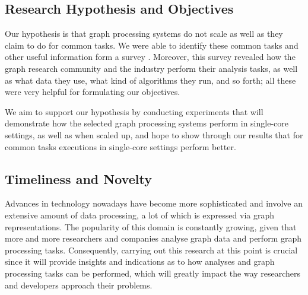\documentclass[a4paper,11pt]{article}
\begin{document}
\subsection{Research Hypothesis and Objectives}

\par Our hypothesis is that graph processing systems do not scale as well as they claim to do for common tasks. We were able to identify these common tasks and other useful information form a survey \cite{survey}. Moreover, this survey revealed how the graph research community and the industry perform their analysis tasks, as well as what data they use, what kind of algorithms they run, and so forth; all these were very helpful for formulating our objectives.

\medskip

\par We aim to support our hypothesis by conducting experiments that will demonstrate how the selected graph processing systems perform in single-core settings, as well as when scaled up, and hope to show through our results that for common tasks executions in single-core settings perform better.



\subsection{Timeliness and Novelty}

\par Advances in technology nowadays have become more sophisticated and involve an extensive amount of data processing, a lot of which is expressed via graph representations. The popularity of this domain is constantly growing, given that more and more researchers and companies analyse graph data and perform graph processing tasks. Consequently, carrying out this research at this point is crucial since it will provide insights and indications as to how analyses and graph processing tasks can be performed, which will greatly impact the way researchers and developers approach their problems.

\end{document}
